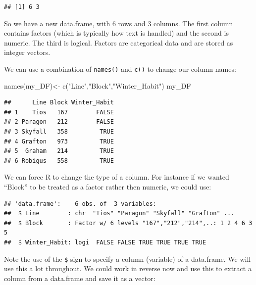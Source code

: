 \documentclass[
]{book}
\newenvironment{Shaded}{\begin{snugshade}}{\end{snugshade}}
\newcommand{\FunctionTok}[1]{\textcolor[rgb]{0.00,0.00,0.00}{#1}}
\newcommand{\NormalTok}[1]{#1}
\newcommand{\OtherTok}[1]{\textcolor[rgb]{0.56,0.35,0.01}{#1}}
\newcommand{\SpecialCharTok}[1]{\textcolor[rgb]{0.00,0.00,0.00}{#1}}
\newcommand{\StringTok}[1]{\textcolor[rgb]{0.31,0.60,0.02}{#1}}
\begin{document}
\begin{verbatim}
## [1] 6 3
\end{verbatim}

So we have a new data.frame, with 6 rows and 3 columns. The first column contains factors (which is typically how text is handled) and the second is numeric. The third is logical. Factors are categorical data and are stored as integer vectors.

We can use a combination of \texttt{names()} and \texttt{c()} to change our column names:

\begin{Shaded}
\begin{Highlighting}[]
\FunctionTok{names}\NormalTok{(my\_DF)}\OtherTok{\textless{}{-}} \FunctionTok{c}\NormalTok{(}\StringTok{"Line"}\NormalTok{,}\StringTok{"Block"}\NormalTok{,}\StringTok{"Winter\_Habit"}\NormalTok{)}
\NormalTok{my\_DF}
\end{Highlighting}
\end{Shaded}

\begin{verbatim}
##      Line Block Winter_Habit
## 1    Tios   167        FALSE
## 2 Paragon   212        FALSE
## 3 Skyfall   358         TRUE
## 4 Grafton   973         TRUE
## 5  Graham   214         TRUE
## 6 Robigus   558         TRUE
\end{verbatim}

We can force R to change the type of a column. For instance if we wanted ``Block'' to be treated as a factor rather then numeric, we could use:

\begin{Shaded}
\end{Shaded}

\begin{verbatim}
## 'data.frame':    6 obs. of  3 variables:
##  $ Line        : chr  "Tios" "Paragon" "Skyfall" "Grafton" ...
##  $ Block       : Factor w/ 6 levels "167","212","214",..: 1 2 4 6 3 5
##  $ Winter_Habit: logi  FALSE FALSE TRUE TRUE TRUE TRUE
\end{verbatim}

Note the use of the \texttt{\$} sign to specify a column (variable) of a data.frame. We will use this a lot throughout. We could work in reverse now and use this to extract a column from a data.frame and save it as a vector:
\end{document}
